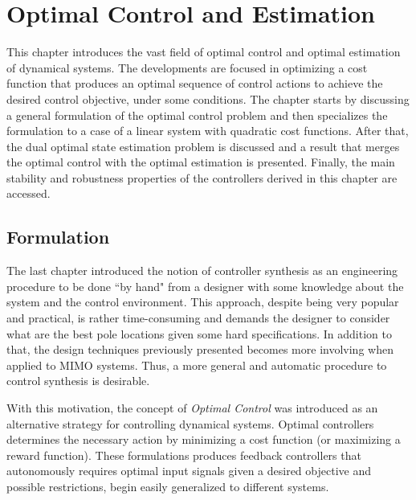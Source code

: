 \documentclass[a4paper,11pt]{book}
\numberwithin{figure}{chapter}
\numberwithin{equation}{chapter}
\numberwithin{table}{chapter}
\theoremstyle{definition}
\begin{document}

\clearpage
\chapter{Optimal Control and Estimation}

This chapter introduces the vast field of optimal control and optimal estimation of dynamical systems. The developments are focused in optimizing a cost function that produces an optimal sequence of control actions to achieve the desired control objective, under some conditions. The chapter starts by discussing a general formulation of the optimal control problem and then specializes the formulation to a case of a linear system with quadratic cost functions. After that, the dual optimal state estimation problem is discussed and a result that merges the optimal control with the optimal estimation is presented. Finally, the main stability and robustness properties of the controllers derived in this chapter are accessed.

\section{Formulation}

The last chapter introduced the notion of controller synthesis as an engineering procedure to be done ``by hand" from a designer with some knowledge about the system and the control environment. This approach, despite being very popular and practical, is rather time-consuming and demands the designer to consider what are the best pole locations given some hard specifications. In addition to that, the design techniques previously presented becomes more involving when applied to MIMO systems. Thus, a more general and automatic procedure to control synthesis is desirable.

With this motivation, the concept of \textit{Optimal Control} \cite{Moore:1990, Kirk:1998, Liberzon:2012, Bertsekas:2017} was introduced as an alternative strategy for controlling dynamical systems. Optimal controllers determines the necessary action by minimizing a cost function (or maximizing a reward function). These formulations produces feedback controllers that autonomously requires optimal input signals given a desired objective and possible restrictions, begin easily generalized to different systems.
\end{document}
